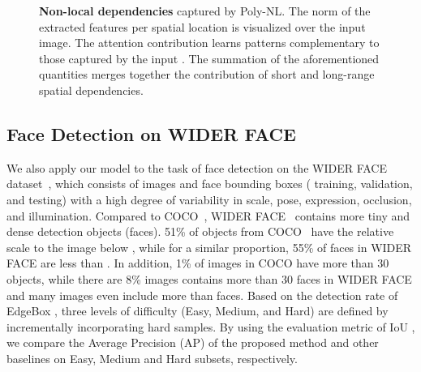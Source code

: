 \documentclass[10pt,twocolumn,letterpaper]{article}
\begin{document}
\begin{figure*}[t]
\vspace{0.1cm}
  \hspace*{0.3cm}
  \hspace*{0.3cm}
\hspace*{0.3cm}
  \hspace*{0.4cm}
  \hspace*{0.3cm}
  \hspace*{0.3cm}
  \hspace*{0.3cm}
  \vspace{-0.1cm}
  \caption{ \textbf{Non-local dependencies} captured by Poly-NL. The norm of the extracted features per spatial location is visualized over the input image. The attention contribution  learns patterns complementary to those captured by the input . The summation of the aforementioned quantities merges together the contribution of short and long-range spatial dependencies.\vspace{-0.1cm}}
  \label{Fig:Poly_NL_attention_visual}
\end{figure*}

\subsection{Face Detection on WIDER FACE}
We also apply our model to the task of face detection on the WIDER FACE dataset~\cite{yang2016wider}, which consists of  images and  face bounding boxes ( training,  validation, and  testing) with a high degree of variability in scale, pose, expression, occlusion, and illumination. Compared to COCO~\cite{lin2014microsoft}, WIDER FACE~\cite{yang2016wider} contains more tiny and dense detection objects (\ie faces). 51\% of objects from COCO~\cite{lin2014microsoft} have the relative scale to the image below , while for a similar proportion, 55\% of faces in WIDER FACE are less than . In addition, 1\% of images in COCO have more than 30 objects, while there are 8\% images contains more than 30 faces in WIDER FACE and many images even include more than  faces. Based on the detection rate of EdgeBox \cite{zitnick2014edge}, three levels of difficulty (\ie Easy, Medium, and Hard) are defined by incrementally incorporating hard samples. By using the evaluation metric of IoU , we compare the Average Precision (AP) of the proposed method and other baselines on Easy, Medium and Hard subsets, respectively. 
\end{document}
